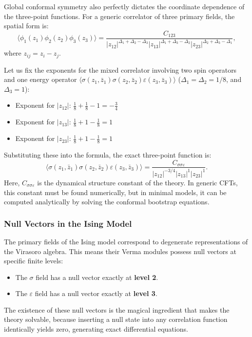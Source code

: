 Global conformal symmetry also perfectly dictates the coordinate dependence of the three-point functions. For a generic correlator of three primary fields, the spatial form is:
\[
    \langle \phi_1(z_1) \phi_2(z_2) \phi_3(z_3) \rangle = \frac{C_{123}}{|z_{12}|^{\Delta_1 + \Delta_2 - \Delta_3} |z_{13}|^{\Delta_1 + \Delta_3 - \Delta_2} |z_{23}|^{\Delta_2 + \Delta_3 - \Delta_1}},
\]
where \(z_{ij} = z_i - z_j\).

Let us fix the exponents for the mixed correlator involving two spin operators and one energy operator \(\langle \sigma(z_1, \bar{z}_1) \sigma(z_2, \bar{z}_2) \varepsilon(z_3, \bar{z}_3) \rangle\) (\(\Delta_1 = \Delta_2 = 1/8\), and \(\Delta_3 = 1\)):
\begin{itemize}
    \item Exponent for \(|z_{12}|\): \(\frac{1}{8} + \frac{1}{8} - 1 = -\frac{3}{4}\)
    \item Exponent for \(|z_{13}|\): \(\frac{1}{8} + 1 - \frac{1}{8} = 1\)
    \item Exponent for \(|z_{23}|\): \(\frac{1}{8} + 1 - \frac{1}{8} = 1\)
\end{itemize}
Substituting these into the formula, the exact three-point function is:
\[
    \langle \sigma(z_1, \bar{z}_1) \sigma(z_2, \bar{z}_2) \varepsilon(z_3, \bar{z}_3) \rangle = \frac{C_{\sigma \sigma \varepsilon}}{|z_{12}|^{-3/4} |z_{13}|^{1} |z_{23}|^{1}}.
\]
Here, \(C_{\sigma \sigma \varepsilon}\) is the dynamical structure constant of the theory. In generic CFTs, this constant must be found numerically, but in minimal models, it can be computed analytically by solving the conformal bootstrap equations.

\subsubsection{Null Vectors in the Ising Model}

The primary fields of the Ising model correspond to degenerate representations of the Virasoro algebra. This means their Verma modules possess null vectors at specific finite levels:
\begin{itemize}
    \item The \(\sigma\) field has a null vector exactly at \textbf{level 2}.
    \item The \(\varepsilon\) field has a null vector exactly at \textbf{level 3}.
\end{itemize}
The existence of these null vectors is the magical ingredient that makes the theory solvable, because inserting a null state into any correlation function identically yields zero, generating exact differential equations.

